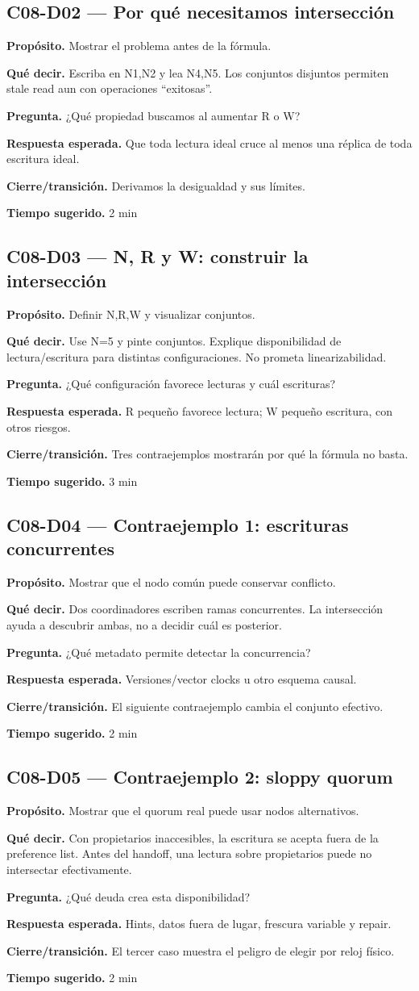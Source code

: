 \documentclass[variant=docente,cover=institutional,mode=screen]{ua-engineering-v6-article}
\newcommand{\FrameField}[2]{\par\noindent\textbf{#1.} #2\par}
\begin{document}
\subsection*{C08-D02 --- Por qué necesitamos intersección}
\FrameField{Propósito}{Mostrar el problema antes de la fórmula.}
\FrameField{Qué decir}{Escriba en N1,N2 y lea N4,N5. Los conjuntos disjuntos permiten stale read aun con operaciones “exitosas”.}
\FrameField{Pregunta}{¿Qué propiedad buscamos al aumentar R o W?}
\FrameField{Respuesta esperada}{Que toda lectura ideal cruce al menos una réplica de toda escritura ideal.}
\FrameField{Cierre/transición}{Derivamos la desigualdad y sus límites.}
\FrameField{Tiempo sugerido}{2 min}

\subsection*{C08-D03 --- N, R y W: construir la intersección}
\FrameField{Propósito}{Definir N,R,W y visualizar conjuntos.}
\FrameField{Qué decir}{Use N=5 y pinte conjuntos. Explique disponibilidad de lectura/escritura para distintas configuraciones. No prometa linearizabilidad.}
\FrameField{Pregunta}{¿Qué configuración favorece lecturas y cuál escrituras?}
\FrameField{Respuesta esperada}{R pequeño favorece lectura; W pequeño escritura, con otros riesgos.}
\FrameField{Cierre/transición}{Tres contraejemplos mostrarán por qué la fórmula no basta.}
\FrameField{Tiempo sugerido}{3 min}

\subsection*{C08-D04 --- Contraejemplo 1: escrituras concurrentes}
\FrameField{Propósito}{Mostrar que el nodo común puede conservar conflicto.}
\FrameField{Qué decir}{Dos coordinadores escriben ramas concurrentes. La intersección ayuda a descubrir ambas, no a decidir cuál es posterior.}
\FrameField{Pregunta}{¿Qué metadato permite detectar la concurrencia?}
\FrameField{Respuesta esperada}{Versiones/vector clocks u otro esquema causal.}
\FrameField{Cierre/transición}{El siguiente contraejemplo cambia el conjunto efectivo.}
\FrameField{Tiempo sugerido}{2 min}

\subsection*{C08-D05 --- Contraejemplo 2: sloppy quorum}
\FrameField{Propósito}{Mostrar que el quorum real puede usar nodos alternativos.}
\FrameField{Qué decir}{Con propietarios inaccesibles, la escritura se acepta fuera de la preference list. Antes del handoff, una lectura sobre propietarios puede no intersectar efectivamente.}
\FrameField{Pregunta}{¿Qué deuda crea esta disponibilidad?}
\FrameField{Respuesta esperada}{Hints, datos fuera de lugar, frescura variable y repair.}
\FrameField{Cierre/transición}{El tercer caso muestra el peligro de elegir por reloj físico.}
\FrameField{Tiempo sugerido}{2 min}
\end{document}
